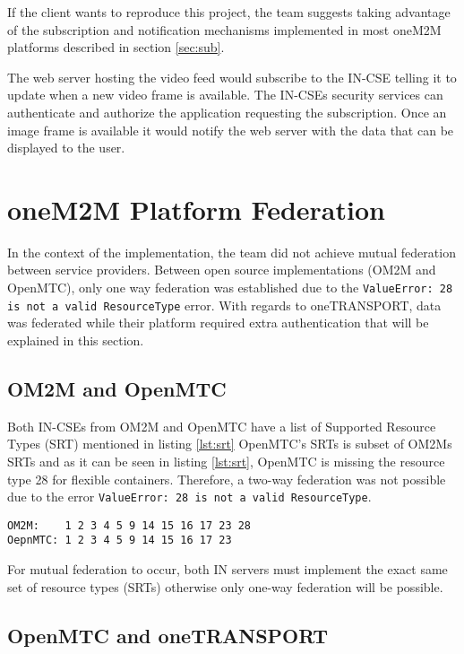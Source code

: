 If the client wants to reproduce this project, the team suggests taking advantage of the subscription and notification mechanisms implemented in most oneM2M platforms described in section \ref{sec:sub}.

The web server hosting the video feed would subscribe to the IN-CSE telling it to update when a new video frame is available. The IN-CSEs security services can authenticate and authorize the application requesting the subscription. Once an image frame is available it would notify the web server with the data that can be displayed to the user.

\section{oneM2M Platform Federation}

In the context of the implementation, the team did not achieve mutual federation between service providers. Between open source implementations (OM2M and OpenMTC), only one way federation was established due to the \lstinline{ValueError: 28 is not a valid ResourceType} error. With regards to oneTRANSPORT, data was federated while their platform required extra authentication that will be explained in this section.  

\subsection{OM2M and OpenMTC}

Both IN-CSEs from OM2M and OpenMTC have a list of Supported Resource Types (SRT) mentioned in listing \ref{lst:srt} OpenMTC's SRTs is subset of OM2Ms SRTs and as it can be seen in listing \ref{lst:srt}, OpenMTC is missing the resource type 28 for flexible containers. Therefore, a two-way federation was not possible due to the error \lstinline{ValueError: 28 is not a valid ResourceType}.\\

\begin{lstlisting}[caption={OM2M and OpenMTC supported resource types}, label={lst:srt}]
OM2M:    1 2 3 4 5 9 14 15 16 17 23 28
OepnMTC: 1 2 3 4 5 9 14 15 16 17 23
\end{lstlisting}

For mutual federation to occur, both IN servers must implement the exact same set of resource types (SRTs) otherwise only one-way federation will be possible.

\subsection{OpenMTC and oneTRANSPORT}

